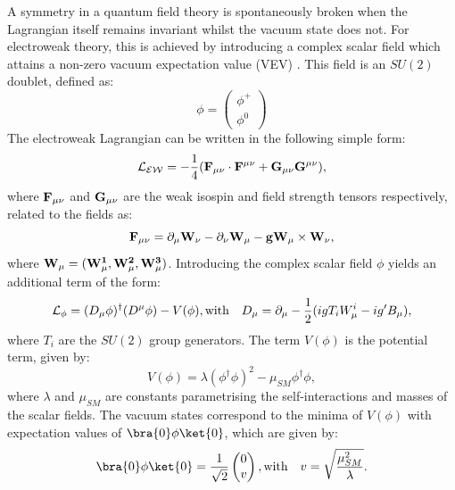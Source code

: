 A symmetry in a quantum field theory is spontaneously broken when the Lagrangian
itself remains invariant whilst the vacuum state does
not\cite{AitchisonGaugeTheories}. For electroweak
theory, this is achieved by introducing a complex scalar field which attains a
non-zero vacuum expectation value (VEV)
\cite{Higgs:1964ia,Higgs:1964pj,Guralnik:1964eu,Higgs:1966ev,Kibble:1967sv}. 
This field is an $SU(2)$ doublet, defined as:
\begin{equation}
\phi = \begin{pmatrix}\phi^{+} \\ \phi^{0} \end{pmatrix}
\end{equation}
The electroweak Lagrangian can be written in the following simple form:
\begin{equation}
\mathcal{L_{EW}} = -\frac{1}{4}(\bf{F_{\mu\nu}}\cdot\bf{F^{\mu\nu}} +
G_{\mu\nu}G^{\mu\nu}), 
\end{equation}
where $\bf{F_{\mu\nu}}$ and $\bf{G_{\mu\nu}}$ are the weak isospin and field strength
tensors respectively, related to the fields as:
\begin{equation}
\bf{F_{\mu\nu}} = \partial_{\mu} \bf{W_{\nu}} - \partial_{\nu}\bf{W_{\mu}} -
g\bf{W_{\mu}} \times \bf{W_{\nu}} , 
\end{equation}
where $\bf{W_{\mu}} = (W_{\mu}^{1},W_{\mu}^{2},W_{\mu}^{3})$. Introducing the
complex scalar field $\phi$ yields an additional term of the form:
\begin{equation}
\mathcal{L_{\phi}} = (D_{\mu}\phi)^{\dagger}(D^{\mu}\phi) - V(\phi), \\ 
\text{with} \quad D_{\mu} = \partial_{\mu} - \frac{1}{2}(igT_{i}W_{\mu}^{i} - ig'B_{\mu}),
\end{equation}
where $T_{i}$ are the $SU(2)$ group generators. The term $V(\phi)$ is the
potential term, given by:
\begin{equation}
V(\phi) = \lambda(\phi^{\dagger}\phi)^{2} - \mu_{SM}\phi^{\dagger}\phi,
\end{equation}
where $\lambda$ and $\mu_{SM}$ are constants parametrising the self-interactions
and masses of the scalar fields. The vacuum states correspond to the minima of
$V(\phi)$ with expectation values of $\bra{0}\phi\ket{0}$, which are given by:
\begin{equation}
\bra{0}\phi\ket{0} = \frac{1}{\sqrt{2}} \begin{pmatrix}0 \\ v \end{pmatrix}, \\
\text{with} \quad v=\sqrt{\frac{\mu_{SM}^{2}}{\lambda}}.
\end{equation}
